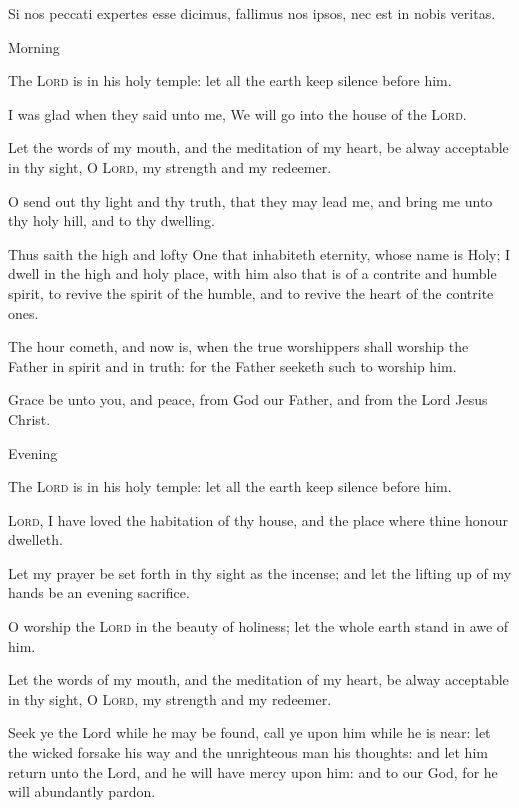 \begin{multicols}{2}
	Si nos peccati expertes esse dicimus, fallimus nos ipsos, nec est in nobis veritas.
\begin{inhead}
Morning
\end{inhead}\noindent
    The \textsc{Lord} is in his holy temple: let all the earth keep silence before him.\par
    I was glad when they said unto me, We will go into the house of the \textsc{Lord}.\par
    Let the words of my mouth, and the meditation of my heart, be alway acceptable in thy sight, O \textsc{Lord}, my strength and my redeemer.\par
    O send out thy light and thy truth, that they may lead me, and bring me unto thy holy hill, and to thy dwelling.\par
    Thus saith the high and lofty One that inhabiteth eternity, whose name is Holy; I dwell in the high and holy place, with him also that is of a contrite and humble spirit, to revive the spirit of the humble, and to revive the heart of the contrite ones.\par
    The hour cometh, and now is, when the true worshippers shall worship the Father in spirit and in truth: for the Father seeketh such to worship him.\par
    Grace be unto you, and peace, from God our Father, and from the Lord Jesus Christ.\par
\begin{inhead}
Evening
\end{inhead}\noindent
    The \textsc{Lord} is in his holy temple: let all the earth keep silence before him.\par
    \textsc{Lord}, I have loved the habitation of thy house, and the place where thine honour dwelleth.\par
    Let my prayer be set forth in thy sight as the incense; and let the lifting up of my hands be an evening sacrifice.\par
    O worship the \textsc{Lord} in the beauty of holiness; let the whole earth stand in awe of him.\par
    Let the words of my mouth, and the meditation of my heart, be alway acceptable in thy sight, O \textsc{Lord}, my strength and my redeemer.\par
    Seek ye the Lord while he may be found, call ye upon him while he is near: let the wicked forsake his way and the unrighteous man his thoughts: and let him return unto the Lord, and he will have mercy upon him: and to our God, for he will abundantly pardon.


\end{multicols}
